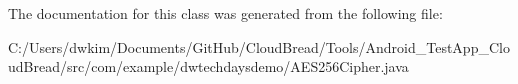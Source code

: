 The documentation for this class was generated from the following file\+:\begin{DoxyCompactItemize}
\item 
C\+:/\+Users/dwkim/\+Documents/\+Git\+Hub/\+Cloud\+Bread/\+Tools/\+Android\+\_\+\+Test\+App\+\_\+\+Cloud\+Bread/src/com/example/dwtechdaysdemo/A\+E\+S256\+Cipher.\+java\end{DoxyCompactItemize}
